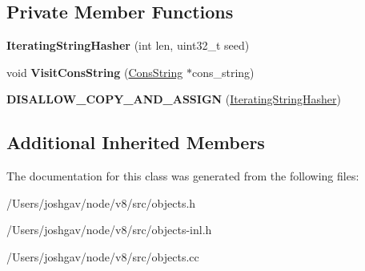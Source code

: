 \subsection*{Private Member Functions}
\begin{DoxyCompactItemize}
\item 
{\bfseries Iterating\+String\+Hasher} (int len, uint32\+\_\+t seed)\hypertarget{classv8_1_1internal_1_1_iterating_string_hasher_af01950ba9e70bb93c69e86c4b471f128}{}\label{classv8_1_1internal_1_1_iterating_string_hasher_af01950ba9e70bb93c69e86c4b471f128}

\item 
void {\bfseries Visit\+Cons\+String} (\hyperlink{classv8_1_1internal_1_1_cons_string}{Cons\+String} $\ast$cons\+\_\+string)\hypertarget{classv8_1_1internal_1_1_iterating_string_hasher_a6dc5ee2b68fc1df1772124864e0b8c30}{}\label{classv8_1_1internal_1_1_iterating_string_hasher_a6dc5ee2b68fc1df1772124864e0b8c30}

\item 
{\bfseries D\+I\+S\+A\+L\+L\+O\+W\+\_\+\+C\+O\+P\+Y\+\_\+\+A\+N\+D\+\_\+\+A\+S\+S\+I\+GN} (\hyperlink{classv8_1_1internal_1_1_iterating_string_hasher}{Iterating\+String\+Hasher})\hypertarget{classv8_1_1internal_1_1_iterating_string_hasher_a0dffcfec9ad04776727df2438bfa45c5}{}\label{classv8_1_1internal_1_1_iterating_string_hasher_a0dffcfec9ad04776727df2438bfa45c5}

\end{DoxyCompactItemize}
\subsection*{Additional Inherited Members}


The documentation for this class was generated from the following files\+:\begin{DoxyCompactItemize}
\item 
/\+Users/joshgav/node/v8/src/objects.\+h\item 
/\+Users/joshgav/node/v8/src/objects-\/inl.\+h\item 
/\+Users/joshgav/node/v8/src/objects.\+cc\end{DoxyCompactItemize}
